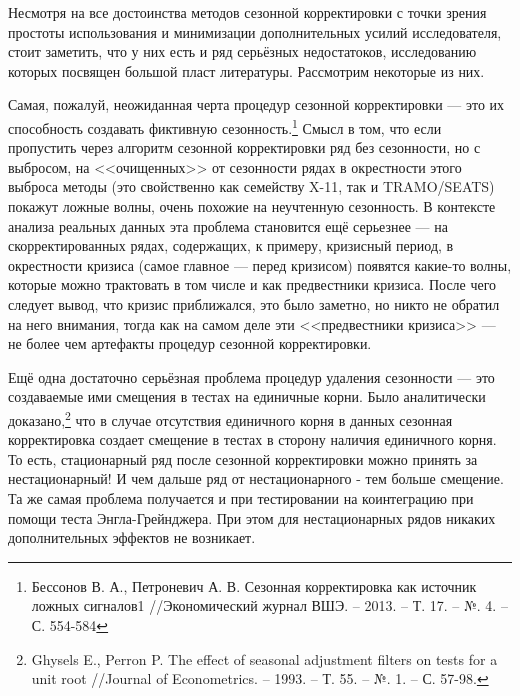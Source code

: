 \documentclass[final,pdftex]{../../template/epsilonj}\usepackage[]{graphicx}\usepackage[]{color}
\begin{document}
Несмотря на все достоинства методов сезонной корректировки с точки зрения простоты использования и минимизации дополнительных усилий исследователя, стоит заметить, что у них есть и ряд серьёзных недостатоков, исследованию которых посвящен большой пласт литературы. Рассмотрим некоторые из них. 

Самая, пожалуй, неожиданная черта процедур сезонной корректировки --- это их способность создавать фиктивную сезонность.\footnote{Бессонов В. А., Петроневич А. В. Сезонная корректировка как источник ложных сигналов1 //Экономический журнал ВШЭ. – 2013. – Т. 17. – №. 4. – С. 554-584} Смысл в том, что если пропустить через алгоритм сезонной корректировки ряд без сезонности, но с выбросом, на <<очищенных>> от сезонности рядах в окрестности этого выброса методы (это свойственно как семейству X-11, так и TRAMO/SEATS) покажут ложные волны, очень похожие на неучтенную сезонность. В контексте анализа реальных данных эта проблема становится ещё серьезнее --- на скорректированных рядах, содержащих, к примеру, кризисный период, в окрестности кризиса (самое главное --- перед кризисом) появятся какие-то волны, которые можно трактовать в том числе и как предвестники кризиса. После чего следует вывод, что кризис приближался, это было заметно, но никто не обратил на него внимания, тогда как на самом деле эти <<предвестники кризиса>> --- не более чем артефакты процедур сезонной корректировки. 

Ещё одна достаточно серьёзная проблема процедур удаления сезонности --- это создаваемые ими смещения в тестах на единичные корни. Было аналитически доказано,\footnote{Ghysels E., Perron P. The effect of seasonal adjustment filters on tests for a unit root //Journal of Econometrics. – 1993. – Т. 55. – №. 1. – С. 57-98.} что в случае отсутствия единичного корня в данных сезонная корректировка создает смещение в тестах в сторону наличия единичного корня. То есть, стационарный ряд после сезонной корректировки можно принять за нестационарный! И чем дальше ряд от нестационарного - тем больше смещение. Та же самая проблема получается и при тестировании на коинтеграцию при помощи теста Энгла-Грейнджера. При этом для нестационарных рядов никаких дополнительных эффектов не возникает. 
\end{document}
